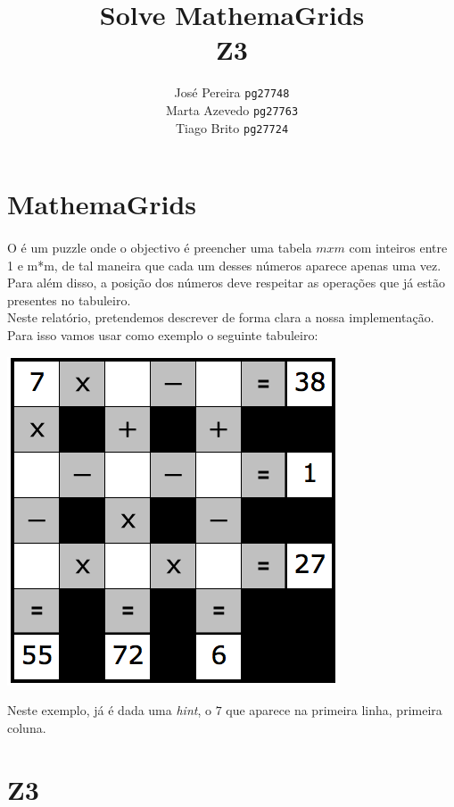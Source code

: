 \documentclass{article}
\title{Solve MathemaGrids\\ Z3}
\author{José Pereira \texttt{pg27748} 
		\\ Marta Azevedo \texttt{pg27763}
		              \\ Tiago Brito \texttt{pg27724}}
\begin{document}
\maketitle
\section{MathemaGrids}

\paragraph{} 
O {} é um puzzle onde o objectivo é preencher uma tabela $mxm$ com inteiros entre 1 e m*m, de tal maneira que cada um desses números aparece apenas uma vez. 
\\

Para além disso, a posição dos números deve respeitar as operações que já estão presentes no tabuleiro.
\\
Neste relatório, pretendemos descrever de forma clara a nossa implementação.
\\

Para isso vamos usar como exemplo o seguinte tabuleiro:
\begin{center}
\includegraphics[scale=0.4]{exemplo_mathemagrids}
\end{center}

Neste exemplo, já é dada uma {\it{hint}}, o $7$ que aparece na primeira linha, primeira coluna.

\section{Z3}
\end{document}

